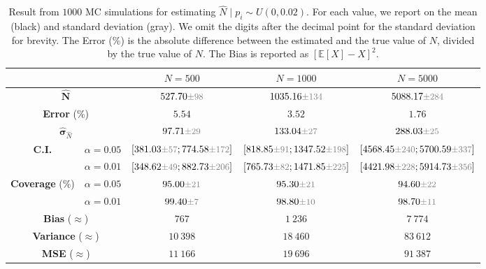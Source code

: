 \begin{table}[t]
    \centering 
    \caption*{$p_i \sim U(0, 0.02)$}
    \begin{tabular}{c c|c c c}
        \toprule
        & & \multicolumn{1}{|c|}{${N}=500$} & \multicolumn{1}{c|}{${N}=1000$} & \multicolumn{1}{c}{${N}=5000$} \\
        \midrule
        \multicolumn{2}{c|}{${\hat{\mathbf{N}}}$} & $527.70 \variance{98}$ & $1035.16 \variance{134}$ & $5088.17 \variance{284}$  \\
        \multicolumn{2}{c|}{\textbf{Error} (\%)} & $5.54$ & $3.52$ & $1.76$ \\
        \multicolumn{2}{c|}{${\hat{\mathbf{\sigma}}}_{\hat{N}}$} & $97.71 \variance{29}$ & $133.04 \variance{27}$ & $288.03 \variance{25}$\\
        \multirow{2}{*}{\textbf{C.I.}} & $\alpha = 0.05$ & $[381.03 \variance{57}; 774.58 \variance{172}]$ & $[818.85 \variance{91}; 1347.52 \variance{198}]$ & $[4568.45 \variance{240}; 5700.59 \variance{337}]$
        \\
        & $\alpha = 0.01$ & $[348.62 \variance{49}; 882.73 \variance{206}]$ & $[765.73 \variance{82}; 1471.85 \variance{225}]$ & $[4421.98 \variance{228}; 5914.73 \variance{356}]$ \\
        \midrule
        \multirow{2}{*}{\textbf{Coverage} (\%)} & $\alpha = 0.05$ & $95.00 \variance{21}$ & $95.30 \variance{21}$ & $94.60 \variance{22}$ \\
        & $\alpha = 0.01$ & $99.40 \variance{7}$ & $98.80 \variance{10}$ & $98.70 \variance{11}$ \\
        \multicolumn{2}{c|}{\textbf{Bias} ($\approx$)} & $767$ & $1\ 236$ & $7\ 774$ \\
        \multicolumn{2}{c|}{\textbf{Variance} ($\approx$)} & $10\ 398$ & $18\ 460$ & $83\ 612$ \\
        \multicolumn{2}{c|}{\textbf{MSE} ($\approx$)} & $11\ 166$ & $19\ 696$ & $91\ 387$ \\
        \bottomrule
    \end{tabular}
    \caption{Result from $1000$ MC simulations for estimating $\hat{N} \mid p_i \sim U(0, 0.02)$. For each value, we report on the mean (black) and standard deviation (gray). We omit the digits after the decimal point for the standard deviation for brevity.
    The Error (\%) is the absolute difference between the estimated and the true value of $N$, divided by the true value of $N$. The Bias is reported as ${\left[ \mathbb{E}[X] - X \right]}^2$.}
    \label{tab:problem_2_results_uniform_0_02}
\end{table}

